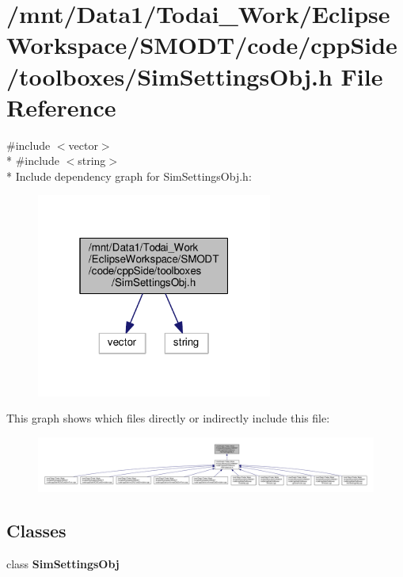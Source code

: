 \section{/mnt/\-Data1/\-Todai\-\_\-\-Work/\-Eclipse\-Workspace/\-S\-M\-O\-D\-T/code/cpp\-Side/toolboxes/\-Sim\-Settings\-Obj.h File Reference}
\label{_sim_settings_obj_8h}
{\ttfamily \#include $<$vector$>$}\\*
{\ttfamily \#include $<$string$>$}\\*
Include dependency graph for Sim\-Settings\-Obj.\-h\-:
\nopagebreak
\begin{figure}[H]
\begin{center}
\leavevmode
\includegraphics[width=220pt]{_sim_settings_obj_8h__incl}
\end{center}
\end{figure}
This graph shows which files directly or indirectly include this file\-:
\nopagebreak
\begin{figure}[H]
\begin{center}
\leavevmode
\includegraphics[width=350pt]{_sim_settings_obj_8h__dep__incl}
\end{center}
\end{figure}
\subsection*{Classes}
\begin{DoxyCompactItemize}
\item 
class {\bf Sim\-Settings\-Obj}
\end{DoxyCompactItemize}
